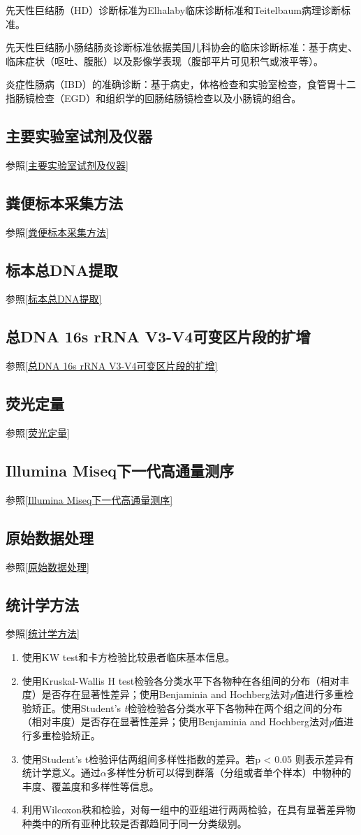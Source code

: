     先天性巨结肠（HD）诊断标准为Elhalaby临床诊断标准\cite{elhalaby1995enterocolitis}和Teitelbaum病理诊断标准。

    先天性巨结肠小肠结肠炎诊断标准依据美国儿科协会的临床诊断标准\cite{imamura1992mucosal}：基于病史、临床症状（呕吐、腹胀）以及影像学表现（腹部平片可见积气或液平等）。

    炎症性肠病（IBD）的准确诊断：基于病史，体格检查和实验室检查，食管胃十二指肠镜检查（EGD）和组织学的回肠结肠镜检查以及小肠镜的组合。



  \subsection{主要实验室试剂及仪器}
  参照\ref{主要实验室试剂及仪器}
  \subsection{粪便标本采集方法}
  参照\ref{粪便标本采集方法}
  \subsection{标本总DNA提取}
  参照\ref{标本总DNA提取}
  \subsection{总DNA 16s rRNA V3-V4可变区片段的扩增}
  参照\ref{总DNA 16s rRNA V3-V4可变区片段的扩增}
  \subsection{荧光定量}
  参照\ref{荧光定量}
  \subsection{Illumina Miseq下一代高通量测序}
  参照\ref{Illumina Miseq下一代高通量测序}
  \subsection{原始数据处理}
  参照\ref{原始数据处理}
  \subsection{统计学方法}
  参照\ref{统计学方法}
  \begin{enumerate}
    \item 使用KW test和卡方检验比较患者临床基本信息。
    \item 使用Kruskal-Wallis H test检验各分类水平下各物种在各组间的分布（相对丰度）是否存在显著性差异；使用Benjaminia and Hochberg法对\textit{p}值进行多重检验矫正。使用Student’s \textit{t}检验检验各分类水平下各物种在两个组之间的分布（相对丰度）是否存在显著性差异；使用Benjaminia and Hochberg法对\textit{p}值进行多重检验矫正。
    \item 使用Student’s t检验评估两组间多样性指数的差异。若p < 0.05 则表示差异有统计学意义。通过$\alpha$多样性分析可以得到群落（分组或者单个样本）中物种的丰度、覆盖度和多样性等信息。
    \item 利用Wilcoxon秩和检验，对每一组中的亚组进行两两检验，在具有显著差异物种类中的所有亚种比较是否都趋同于同一分类级别。
  \end{enumerate}

